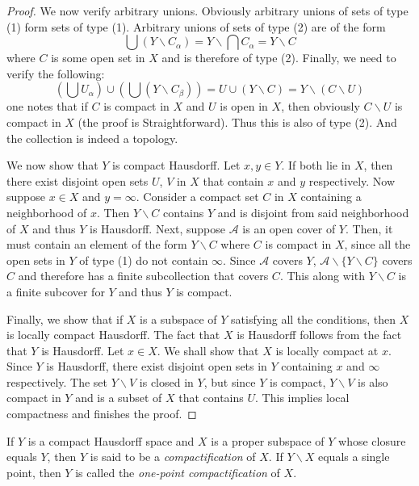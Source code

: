 \begin{proof}
    We now verify arbitrary unions. Obviously arbitrary unions of sets of type (1) form sets of type (1). Arbitrary unions of sets of type (2) are of the form 
    \begin{equation*}
        \bigcup\left(Y\backslash C_\alpha\right) = Y\backslash\bigcap C_\alpha = Y\backslash C
    \end{equation*}
    where $C$ is some open set in $X$ and is therefore of type (2). Finally, we need to verify the following:
    \begin{equation*}
        \left(\bigcup U_\alpha\right)\cup\left(\bigcup\left(Y\backslash C_\beta\right)\right) = U\cup\left(Y\backslash C\right) = Y\backslash(C\backslash U)
    \end{equation*}
    one notes that if $C$ is compact in $X$ and $U$ is open in $X$, then obviously $C\backslash U$ is compact in $X$ (the proof is Straightforward). Thus this is also of type (2). And the collection is indeed a topology.

    We now show that $Y$ is compact Hausdorff. Let $x,y\in Y$. If both lie in $X$, then there exist disjoint open sets $U$, $V$ in $X$ that contain $x$ and $y$ respectively. Now suppose $x\in X$ and $y =\infty$. Consider a compact set $C$ in $X$ containing a neighborhood of $x$. Then $Y\backslash C$ contains $Y$ and is disjoint from said neighborhood of $X$ and thus $Y$ is Hausdorff. Next, suppose $\mathscr{A}$ is an open cover of $Y$. Then, it must contain an element of the form $Y\backslash C$ where $C$ is compact in $X$, since all the open sets in $Y$ of type (1) do not contain $\infty$. Since $\mathscr{A}$ covers $Y$, $\mathscr{A}\backslash\{Y\backslash C\}$ covers $C$ and therefore has a finite subcollection that covers $C$. This along with $Y\backslash C$ is a finite subcover for $Y$ and thus $Y$ is compact.

    Finally, we show that if $X$ is a subspace of $Y$ satisfying all the conditions, then $X$ is locally compact Hausdorff. The fact that $X$ is Hausdorff follows from the fact that $Y$ is Hausdorff. Let $x\in X$. We shall show that $X$ is locally compact at $x$. Since $Y$ is Hausdorff, there exist disjoint open sets in $Y$ containing $x$ and $\infty$ respectively. The set $Y\backslash V$ is closed in $Y$, but since $Y$ is compact, $Y\backslash V$ is also compact in $Y$ and is a subset of $X$ that contains $U$. This implies local compactness and finishes the proof.
\end{proof}

\begin{definition}[Compactification]
    If $Y$ is a compact Hausdorff space and $X$ is a proper subspace of $Y$ whose closure equals $Y$, then $Y$ is said to be a \textit{compactification} of $X$. If $Y\backslash X$ equals a single point, then $Y$ is called the \textit{one-point compactification} of $X$.
\end{definition}
